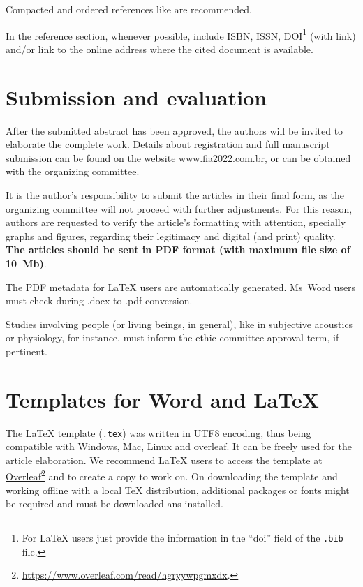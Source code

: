 \documentclass[12pt, a4paper, twoside, twocolumn]{article}
\begin{document}
Compacted and ordered references like \cite{Mareze-2017,Oppenheim-2010,Muller-2001,Mareze-2019} are recommended.

In the reference section, whenever possible, include ISBN, ISSN, DOI\footnote{For LaTeX users just provide the information in the  ``doi'' field of the  \texttt{.bib} file.} (with link) and/or link to the online address where the cited document is available.

\section{Submission and evaluation}

After the submitted abstract has been approved, the authors will be invited to elaborate the complete work. Details about registration and full manuscript submission can be found on the website \url{www.fia2022.com.br}, or can be obtained with the organizing committee.

It is the author's responsibility to submit the articles in their final form, as the organizing committee will not proceed with further adjustments. For this reason, authors are requested to verify the article's formatting with attention, specially graphs and figures, regarding their legitimacy and digital (and print) quality. \textbf{The articles should be sent in PDF format (with maximum file size of 10~Mb)}.

The PDF metadata for \LaTeX\xspace users are automatically generated. Ms~Word users must check during .docx to .pdf conversion.

Studies involving people (or living beings, in general), like in subjective acoustics or physiology, for instance, must inform the ethic committee approval term, if pertinent.

\section{Templates for Word and \LaTeX}

The \LaTeX\xspace template (\texttt{.tex}) was written in UTF8 encoding, thus being compatible with Windows, Mac, Linux and overleaf. It can be freely used for the article elaboration. We recommend \LaTeX{} users to access the template at \href{https://www.overleaf.com/read/hgryywpgmxdx}{Overleaf}\footnote{\url{https://www.overleaf.com/read/hgryywpgmxdx}.} and to create a copy to work on. On downloading the template and working offline with a local \TeX{} distribution, additional packages or fonts might be required and must be downloaded ans installed.
\end{document}
